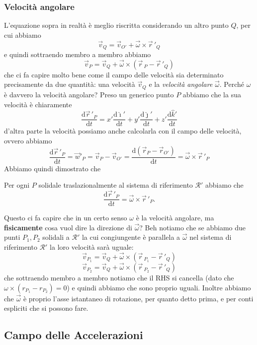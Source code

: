 \documentclass[11pt]{scrartcl}
\newcommand{\dif}{\text{d}}
\newcommand{\ihat}{\hat{\imath}}
\newcommand{\jhat}{\hat{\jmath}}
\newcommand{\khat}{\hat{k}}
\begin{document}
	\subsubsection{Velocità angolare}
	L'equazione sopra in realtà è meglio riscritta considerando un altro punto $Q$, per cui abbiamo
	$$\vec{v}_Q=\vec{v}_{O'}+\vec{\omega}\times \vec{r}\,'_Q$$
	e quindi sottraendo membro a membro abbiamo
	$$\vec{v}_P=\vec{v}_Q+\vec{\omega}\times\left(\vec{r}\,_P-\vec{r}\,'_Q\right)$$
	che ci fa capire molto bene come il campo delle velocità sia determinato precisamente da due quantità: una velocità $\vec{v}_Q$ e la \textit{velocità angolare} $\vec{\omega}$. Perché $\omega$ è davvero la velocità angolare? Preso un generico punto $P$ abbiamo che la sua velocità è chiaramente
	$$\frac{\dif \vec{r}\,'_P}{\dif t}=x'\frac{\dif \ihat'}{\dif t}+y'\frac{\dif \jhat'}{\dif t}+z'\frac{\dif \khat'}{\dif t}$$
	d'altra parte la velocità possiamo anche calcolarla con il campo delle velocità, ovvero abbiamo
	$$\frac{\dif \vec{r}\,'_P}{\dif t}=\vec{w}'_P=\vec{v}_P-\vec{v}_{O'}=\frac{\dif (\vec{r}_P-\vec{r}_{O'})}{\dif t}=\vec{\omega}\times \vec{r}\,'_P$$
	Abbiamo quindi dimostrato che
	\begin{lemma}
		Per ogni $P$ solidale traslazionalmente al sistema di riferimento $\mathcal{R}'$ abbiamo che
		$$\frac{\dif \vec{r}\,'_P}{\dif t}=\vec{\omega}\times \vec{r}\,'_P.$$
	\end{lemma}
	Questo ci fa capire che in un certo senso $\omega$ è la velocità angolare, 
	ma \textbf{fisicamente} cosa vuol dire la direzione di $\vec{\omega}$? Beh notiamo che se abbiamo due punti $P_1,P_2$ solidali a $\mathcal{R}'$ la cui congiungente è parallela a $\vec{\omega}$ nel sistema di riferimento $\mathcal{R}'$ la loro velocità sarà uguale:
	$$\vec{v}_{P_1}=\vec{v}_Q+\vec{\omega}\times\left(\vec{r}\,_{P_1}-\vec{r}\,'_Q\right)$$
	$$\vec{v}_{P_2}=\vec{v}_Q+\vec{\omega}\times\left(\vec{r}\,_{P_2}-\vec{r}\,'_Q\right)$$
	che sottraendo membro a membro notiamo che il RHS si cancella (dato che $\omega\times(r_{P_1}-r_{P_2})=0$) e quindi abbiamo che sono proprio uguali. Inoltre abbiamo che $\vec{\omega}$ è proprio l'asse istantaneo di rotazione, per quanto detto prima, e per conti espliciti che si possono fare.
	
	\subsection{Campo delle Accelerazioni}
	
\end{document}
